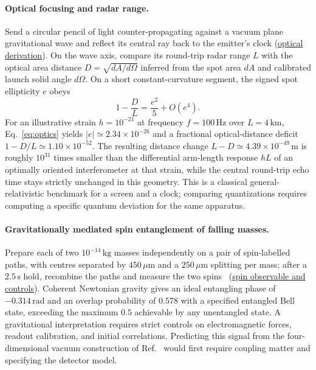 \documentclass[10pt,a4paper]{article}
\numberwithin{equation}{section}
\newcommand{\repo}[2]{\href{https://github.com/sprajs/quantum-gravity/blob/main/#1}{#2}}
\begin{document}
\paragraph{Optical focusing and radar range.}
Send a circular pencil of light counter-propagating against a vacuum plane gravitational wave and reflect its central ray back to the emitter's clock (\repo{audit/observable-optics.md}{optical derivation}).
On the wave axis, compare its round-trip radar range $L$ with the optical area distance $D=\sqrt{dA/d\Omega}$ inferred from the spot area $dA$ and calibrated launch solid angle $d\Omega$.
On a short constant-curvature segment, the signed spot ellipticity $e$ obeys
\begin{equation}
  1 - \frac{D}{L} = \frac{e^2}{5} + O(e^4).
  \label{eq:optics}
\end{equation}
For an illustrative strain $h=10^{-21}$ at frequency $f=100\,\mathrm{Hz}$ over $L=4\,\mathrm{km}$, Eq.~\eqref{eq:optics} yields $|e|\simeq 2.34\times 10^{-26}$ and a fractional optical-distance deficit $1-D/L\simeq 1.10\times 10^{-52}$.
The resulting distance change $L-D\simeq 4.39\times 10^{-49}\,\mathrm{m}$ is roughly $10^{31}$ times smaller than the differential arm-length response $hL$ of an optimally oriented interferometer at that strain, while the central round-trip echo time stays strictly unchanged in this geometry.
This is a classical general-relativistic benchmark for a screen and a clock; comparing quantizations requires computing a specific quantum deviation for the same apparatus.

\paragraph{Gravitationally mediated spin entanglement of falling masses.}
Prepare each of two $10^{-14}\,\mathrm{kg}$ masses independently on a pair of spin-labelled paths, with centres separated by $450\,\mu\mathrm{m}$ and a $250\,\mu\mathrm{m}$ splitting per mass; after a $2.5\,\mathrm{s}$ hold, recombine the paths and measure the two spins~\cite{Bose2017,MarlettoVedral2017} (\repo{audit/observable-lab.md}{spin observable and controls}).
Coherent Newtonian gravity gives an ideal entangling phase of $-0.314\,\mathrm{rad}$ and an overlap probability of $0.578$ with a specified entangled Bell state, exceeding the maximum $0.5$ achievable by any unentangled state.
A gravitational interpretation requires strict controls on electromagnetic forces, readout calibration, and initial correlations.
Predicting this signal from the four-dimensional vacuum construction of Ref.~\cite{Chandrasekaran2026} would first require coupling matter and specifying the detector model.
\end{document}
